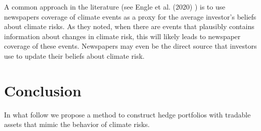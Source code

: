 A common approach in the literature (see Engle et al. (2020) \cite{engle2020hedging})
is to use newspapers coverage of climate events as a proxy 
for the average investor's beliefs about climate risks.
As they noted, when there are events that plausibly
contains information about changes in climate risk,
this will likely leads to newspaper coverage of these events.
Newspapers may even be the direct source that investors
use to update their beliefs about climate risk.


\section{Conclusion}

In what follow we propose a method to construct
hedge portfolios with tradable assets that
mimic the behavior of climate risks. 
